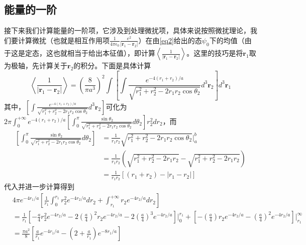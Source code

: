 \subsection{能量的一阶}
接下来我们计算能量的一阶项，它涉及到处理微扰项，具体来说按照微扰理论，我们要计算微扰（也就是相互作用项$\frac{1}{4\pi\epsilon_0}\frac{e^2}{\left|\textbf{r}_1-\textbf{r}_2\right|}$）在由\cref{eq2}给出的态$\psi_0$下的均值（由于这是定态，这也就相当于给出本征值），即计算$\left\langle\frac{1}{\left|\textbf{r}_1-\textbf{r}_2\right|}\right\rangle$。这里的技巧是将$\textbf{r}_1$取为极轴，先计算关于$\textbf{r}_2$的积分。下面是具体计算
$$
\left \langle \frac{1}{\left | \textbf{r}_1-\textbf{r}_2 \right | } \right \rangle 
=
(\frac{8}{\pi a^3})^2 
\int \left [ \int \frac{e^{-4(r_1+r_2)/a}}{\sqrt{r_1^2+r_2^2-2r_1r_2\cos{\theta_2}}} d^3\textbf{r}_2 \right ]
d^3\textbf{r}_1 
$$
其中，$\left [ \int \frac{e^{-4(r_1+r_2)/a}}{\sqrt{r_1^2+r_2^2-2r_1r_2\cos{\theta_2}}} d^3\textbf{r}_2 \right ]$可化为$2\pi 
\int_{0}^{+\infty}e^{-4(r_1+r_2)/a}
\left [   \int_{0}^{\pi}\frac{\sin{\theta_2}}{\sqrt{r_1^2+r_2^2-2r_1r_2\cos{\theta_2}}}d\theta_2 \right ]
r_2^2dr_2$，而
\begin{equation*}
	\begin{split}
		\left [   \int_{0}^{\pi}\frac{\sin{\theta_2}}{\sqrt{r_1^2+r_2^2-2r_1r_2\cos{\theta_2}}}d\theta_2 \right ] &=\frac{1}{r_1r_2} \sqrt{r_1^2+r_2^2-2r_1r_2 \cos{\theta_2}} \bigg|_{a}^{b}\\
		&=\frac{1}{r_1r_2}(\sqrt{r_1^2+r_2^2-2r_1r_2}-\sqrt{r_1^2+r_2^2-2r_1r_2}) \\
		&=\frac{1}{r_1r_2}\left [ (r_1+r_2)-\left | r_1-r_2 \right | \right ] 
	\end{split}
\end{equation*}
代入并进一步计算得到
\begin{equation*}
	\begin{split}
		&4\pi e^{-4r_1/a}
		\left [
		\frac{1}{r_1} \int_{0}^{r_1} r_2^2 e^{-4r_2/a} dr_2
		+
		\int_{r_1}^{+\infty } r_2 e^{-4r_2/a}dr_2
		\right ] \\
		&=\frac{1}{r_1}
		\left [
		-\frac{a}{4}r_2^2 e^{-4r_2/a}
		-2
		\left ( 
		{\frac{a}{4}}
		\right ) ^2
		r_2 e^{-4r_2/a}
		- 
		2\left ( \frac{a}{4} \right )^3
		e^{-4r_2/a}
		\right ] 
		\bigg|_{0}^{r_1}+\left [ 
		-\left ( \frac{a}{4} \right )  r_2 e^{-4r_2/a}
		- 
		\left (\frac{a}{4} \right )^2 e^{-4r_2/a}
		\right ] \bigg|_{r_1}^{\infty}\\
		&=\frac{\pi a^2}{8} 
		\left [
		\frac{a}{r_1} e^{-4r_1/a}
		-\left ( 2+\frac{a}{r_1} \right ) e^{-8r_1/a}
		\right ] 						
	\end{split}
\end{equation*}
